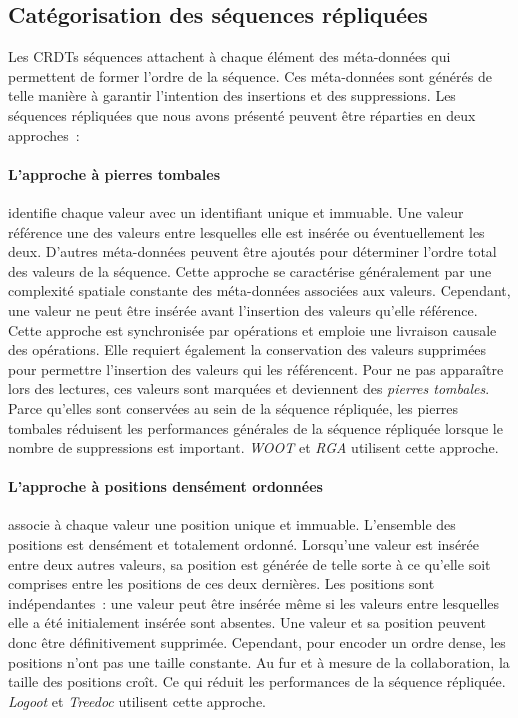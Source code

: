 

\subsection{Catégorisation des séquences répliquées}

Les \acp{CRDT} séquences attachent à chaque élément des méta-données qui permettent de former l'ordre de la séquence.
Ces méta-données sont générés de telle manière à garantir l'intention des insertions et des suppressions.
Les séquences répliquées que nous avons présenté peuvent être réparties en deux approches~:

\paragraph{L'approche à pierres tombales}\autocite{oster_2006_woot, roh_2011_rga} identifie chaque valeur avec un identifiant unique et immuable.
Une valeur référence une des valeurs entre lesquelles elle est insérée ou éventuellement les deux.
D'autres méta-données peuvent être ajoutés pour déterminer l'ordre total des valeurs de la séquence.
Cette approche se caractérise généralement par une complexité spatiale constante des méta-données associées aux valeurs.
Cependant, une valeur ne peut être insérée avant l'insertion des valeurs qu'elle référence.
Cette approche est synchronisée par opérations et emploie une livraison causale des opérations.
Elle requiert également la conservation des valeurs supprimées pour permettre l'insertion des valeurs qui les référencent.
Pour ne pas apparaître lors des lectures, ces valeurs sont marquées et deviennent des \emph{pierres tombales}.
Parce qu'elles sont conservées au sein de la séquence répliquée, les pierres tombales réduisent les performances générales de la séquence répliquée lorsque le nombre de suppressions est important.
\emph{WOOT} et \emph{RGA} utilisent cette approche.

\paragraph{L'approche à positions densément ordonnées}\autocite{weiss_2009_logoot, preguica_2009_treedoc, nedelec_2013_lseq} associe à chaque valeur une position unique et immuable.
L'ensemble des positions est densément et totalement ordonné.
Lorsqu'une valeur est insérée entre deux autres valeurs, sa position est générée de telle sorte à ce qu'elle soit comprises entre les positions de ces deux dernières.
Les positions sont indépendantes~: une valeur peut être insérée même si les valeurs entre lesquelles elle a été initialement insérée sont absentes.
Une valeur et sa position peuvent donc être définitivement supprimée.
Cependant, pour encoder un ordre dense, les positions n'ont pas une taille constante.
Au fur et à mesure de la collaboration, la taille des positions croît.
Ce qui réduit les performances de la séquence répliquée.
\emph{Logoot} et \emph{Treedoc} utilisent cette approche.

